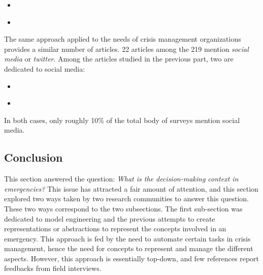 \begin{itemize}
    \item \textcite{purohitIdentifyingSeekersSuppliers2014}
    \item \textcite{ghahremanlouGeotaggingTwitterMessages2014}
\end{itemize}

The same approach applied to the needs of crisis management organizations provides a similar number of articles.
22 articles among the 219 mention \emph{social media} or \emph{twitter}.
Among the articles studied in the previous part, two are dedicated to social media:

\begin{itemize}
    \item \textcite{cobbDesigningDelugeUnderstanding2014}
    \item \textcite{tapiaTrustworthyTweetDeeper2013}
\end{itemize}

In both cases, only roughly 10\% of the total body of surveys mention social media.

\subsection*{Conclusion}
This section answered the question: \emph{What is the decision-making context in emergencies?}
This issue has attracted a fair amount of attention, and this section explored two ways taken by two research communities to answer this question.
These two ways correspond to the two subsections.
The first sub-section was dedicated to model engineering and the previous attempts to create representations
or abstractions to represent the concepts involved in an emergency.
This approach is fed by the need to automate certain tasks in crisis management, hence the need for concepts to represent and manage the different aspects.
However, this approach is essentially top-down, and few references report feedbacks from field interviews.


